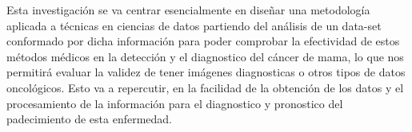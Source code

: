Esta investigación se va centrar esencialmente en diseñar una metodología aplicada a técnicas en ciencias de datos partiendo del análisis de un data-set conformado por dicha información para poder comprobar la efectividad de estos métodos médicos en la detección y el diagnostico del cáncer de mama, lo que nos permitirá evaluar la validez de tener imágenes diagnosticas o otros tipos de datos oncológicos. Esto va a repercutir, en la facilidad de la obtención de los datos y el procesamiento de la información para el diagnostico y pronostico del padecimiento de esta enfermedad.